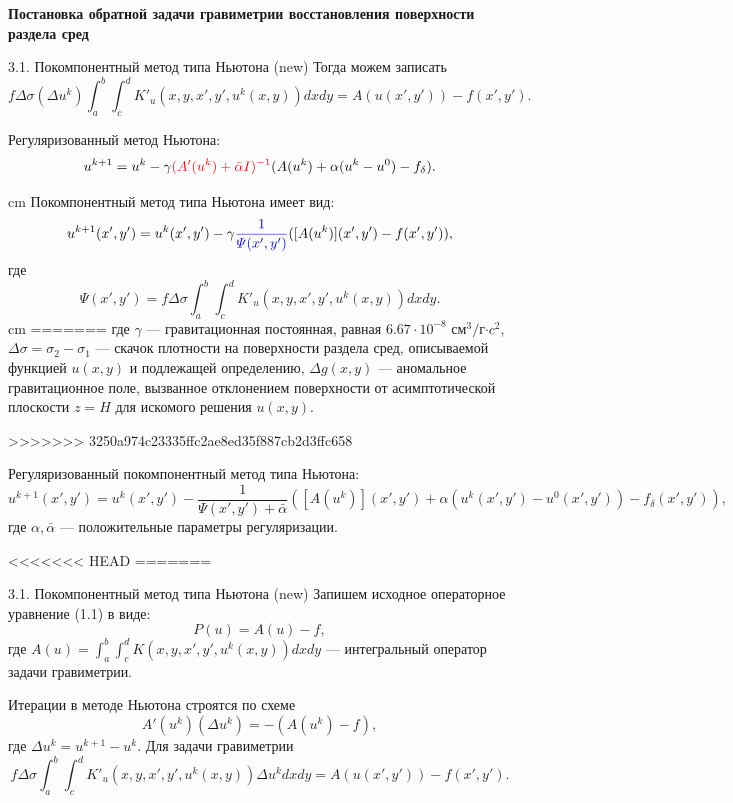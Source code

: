 \documentclass[10pt,pdf, mathserif, hyperref={unicode}]{beamer}
\begin{document}
\begin{frame}{\small\textbf{Постановка обратной задачи гравиметрии восстановления поверхности раздела сред}}
\begin{frame}{3.1. Покомпонентный метод типа Ньютона (new)}
Тогда можем записать
	$$f\Delta\sigma(\Delta u^k)\int_{a}^{b}\int_{c}^{d}K'_u(x,y, x',y',u^k(x,y)) dxdy=A(u(x',y'))-f(x',y').$$
\end{frame}
\begin{frame}{}
	 Регуляризованный метод Ньютона:
	$$ u^{k+1}=u^k-\gamma{\color{red}(A'(u^k)+\bar\alpha I)^{-1}}(A(u^k)+\alpha(u^k-u^0)-f_\delta).$$

	 cm
	Покомпонентный метод типа Ньютона имеет вид:
	$$u^{k+1}(x',y')=u^k(x',y')-\gamma{\color{blue}\frac{1}{\varPsi(x',y')}}([A(u^k)](x',y')-f(x',y')),$$
	где $$\varPsi(x',y')=f\Delta\sigma\int_{a}^{b}\int_{c}^{d}K'_u(x,y, x',y',u^k(x,y)) dxdy.$$
	 cm
=======
	где $\gamma$ --- гравитационная постоянная, равная $6.67\cdot10^{-8}$ см$^3/$г$\cdot c^2$, $\Delta\sigma=\sigma_2-\sigma_1$ --- скачок плотности на поверхности раздела сред, описываемой функцией $u(x,y)$ и подлежащей определению, $\Delta g(x,y)$ --- аномальное гравитационное поле, вызванное отклонением поверхности от асимптотической плоскости $z=H$ для искомого решения $u(x,y)$.
\end{frame}
>>>>>>> 3250a974c23335ffc2ae8ed35f887cb2d3ffc658

	Регуляризованный покомпонентный метод типа Ньютона:
	$$u^{k+1}(x',y')=u^k(x',y')-\frac{1}{\varPsi(x',y')+\bar{\alpha}}([A(u^k)](x',y')+\alpha (u^k(x',y')-u^0(x',y'))-f_\delta(x',y')),$$
	где $\alpha, \bar{\alpha}$ --- положительные параметры регуляризации.
	\let\thefootnote\relax\let\thefootnote\relax{}
\end{frame}
<<<<<<< HEAD
=======
\begin{frame}{3.1. Покомпонентный метод типа Ньютона (new)}
	Запишем исходное операторное уравнение (1.1) в виде:
	$$P(u)=A(u)-f,$$
	где $A(u)=\int_{a}^{b}\int_{c}^{d}K(x,y, x',y',u^k(x,y))dxdy$ --- интегральный оператор задачи гравиметрии.
	
	Итерации в методе Ньютона строятся по схеме
	$$A'(u^k)(\Delta u^k)=-(A(u^k)-f),$$ где $\Delta u^k=u^{k+1}-u^k$.
	Для задачи гравиметрии
	$$f\Delta\sigma\int_{a}^{b}\int_{c}^{d}K'_u(x,y, x',y',u^k(x,y))\Delta u^k dxdy=A(u(x',y'))-f(x',y').$$
\end{frame}
\end{document}
